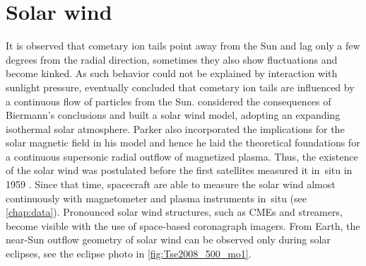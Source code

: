 \clearpage

\begin{figure}[htb]
\end{figure}


\section{Solar wind}
\label{sec:solar_wind}
It is observed that cometary ion tails point away from the Sun and lag only a few degrees from the radial direction, sometimes they also show fluctuations and become kinked. As such behavior could not be explained by interaction with sunlight pressure, eventually \citet{Biermann1951} concluded that cometary ion tails are influenced by a continuous flow of particles from the Sun.	%
\citet{Parker1958} considered the consequences of Biermann's conclusions and built a solar wind model, adopting an expanding isothermal solar atmosphere. Parker also incorporated the implications for the solar magnetic field in his model and hence he laid the theoretical foundations for a continuous supersonic radial outflow of magnetized plasma. Thus, the existence of the solar wind was postulated before the first satellites measured it in~situ in 1959 \citep{Gringauz1960,Neugebauer1966}. Since that time, spacecraft are able to measure the solar wind almost continuously with magnetometer and plasma instruments in~situ (see \autoref{chap:data}). Pronounced solar wind structures, such as CMEs and streamers, become visible with the use of space-based coronagraph imagers. From Earth, the near-Sun outflow geometry of solar wind can be observed only during solar eclipses, see the eclipse photo in \autoref{fig:Tse2008_500_mo1}.

